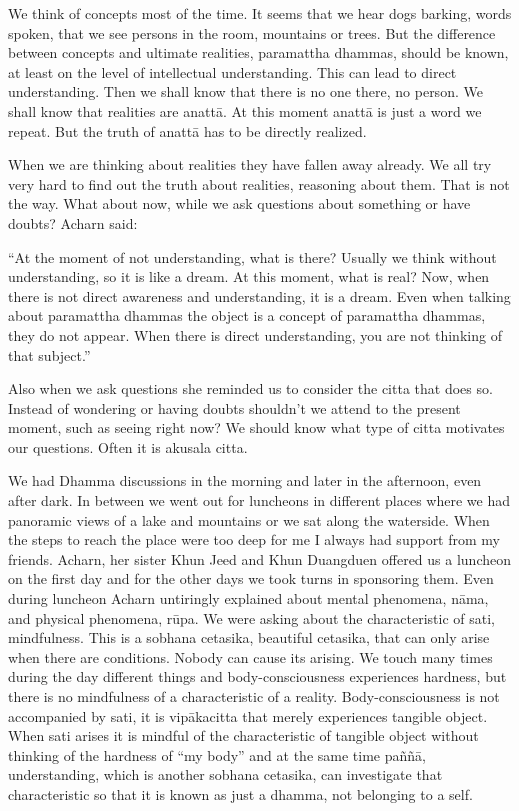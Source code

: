 We think of concepts most of the time. It seems that we hear dogs
barking, words spoken, that we see persons in the room, mountains or
trees. But the difference between concepts and ultimate realities,
paramattha dhammas, should be known, at least on the level of
intellectual understanding. This can lead to direct understanding. Then
we shall know that there is no one there, no person. We shall know that
realities are anattā. At this moment anattā is just a word we repeat.
But the truth of anattā has to be directly realized.

When we are thinking about realities they have fallen away already. We
all try very hard to find out the truth about realities, reasoning about
them. That is not the way. What about now, while we ask questions about
something or have doubts? Acharn said:

``At the moment of not understanding, what is there? Usually we think
without understanding, so it is like a dream. At this moment, what is
real? Now, when there is not direct awareness and understanding, it is a
dream. Even when talking about paramattha dhammas the object is a
concept of paramattha dhammas, they do not appear. When there is direct
understanding, you are not thinking of that subject.''

Also when we ask questions she reminded us to consider the citta that
does so. Instead of wondering or having doubts shouldn't we attend to
the present moment, such as seeing right now? We should know what type
of citta motivates our questions. Often it is akusala citta.

We had Dhamma discussions in the morning and later in the afternoon,
even after dark. In between we went out for luncheons in different
places where we had panoramic views of a lake and mountains or we sat
along the waterside. When the steps to reach the place were too deep for
me I always had support from my friends. Acharn, her sister Khun Jeed
and Khun Duangduen offered us a luncheon on the first day and for the
other days we took turns in sponsoring them. Even during luncheon Acharn
untiringly explained about mental phenomena, nāma, and physical
phenomena, rūpa. We were asking about the characteristic of sati,
mindfulness. This is a sobhana cetasika, beautiful cetasika, that can
only arise when there are conditions. Nobody can cause its arising. We
touch many times during the day different things and body-consciousness
experiences hardness, but there is no mindfulness of a characteristic of
a reality. Body-consciousness is not accompanied by sati, it is
vipākacitta that merely experiences tangible object. When sati arises it
is mindful of the characteristic of tangible object without thinking of
the hardness of ``my body'' and at the same time paññā, understanding,
which is another sobhana cetasika, can investigate that characteristic
so that it is known as just a dhamma, not belonging to a self.

